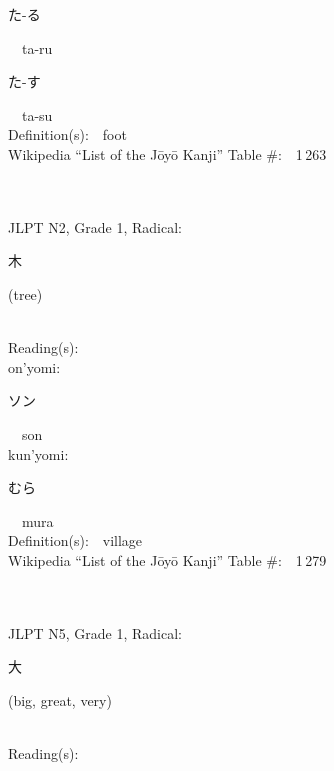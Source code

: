 \begin{multicols}{2}
{\hspace*{2em}}{\begin{CJK}{UTF8}{min} た-る \end{CJK}}\ \ ta-ru\ \ \\
{\hspace*{2em}}{\begin{CJK}{UTF8}{min} た-す \end{CJK}}\ \ ta-su\ \ \\
Definition(s):\ \ foot \\
Wikipedia ``List of the J\=oy\=o Kanji'' Table \#:\ \ 1\,263 \\
\ \ \\
{\fontsize{34pt}{40pt}  }\ \ \\  %
{JLPT N2, Grade 1, Radical:\ \ {\begin{CJK}{UTF8}{min} 木 \end{CJK}} (tree) } \\
Reading(s):\ \ \\
{\hspace*{1em}}on'yomi:\ \ \\
{\hspace*{2em}}{\begin{CJK}{UTF8}{min} ソン \end{CJK}}\ \ son\ \ \\
{\hspace*{1em}}kun'yomi:\ \ \\
{\hspace*{2em}}{\begin{CJK}{UTF8}{min} むら \end{CJK}}\ \ mura\ \ \\
Definition(s):\ \ village \\
Wikipedia ``List of the J\=oy\=o Kanji'' Table \#:\ \ 1\,279 \\
\ \ \\
{\fontsize{34pt}{40pt}  }\ \ \\  %
{JLPT N5, Grade 1, Radical:\ \ {\begin{CJK}{UTF8}{min} 大 \end{CJK}} (big, great, very) } \\
Reading(s):\ \ \\

\end{multicols}
